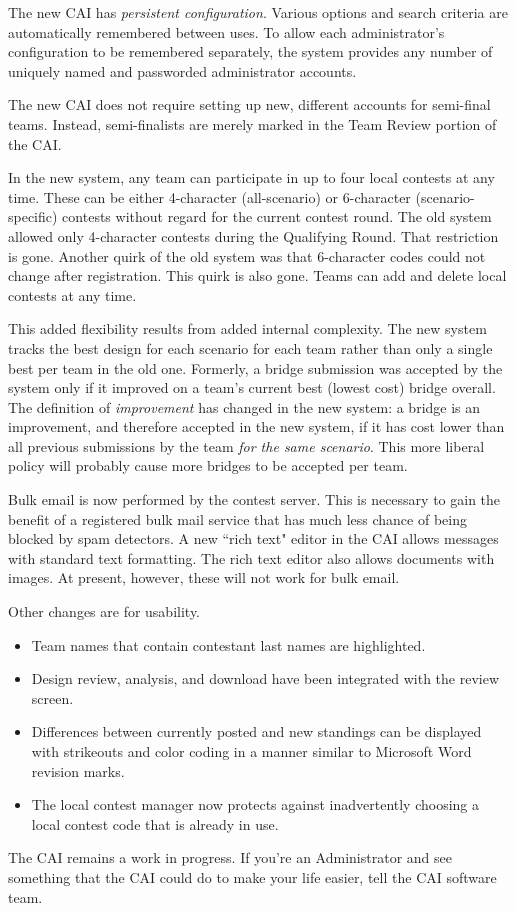 \documentclass[11pt,letterpaper]{refart}
\begin{document}
The new CAI has \emph{persistent configuration}. Various options and
search criteria are automatically remembered between uses.  To allow each 
administrator's configuration
to be remembered separately, the system provides any number of uniquely named and
passworded administrator accounts.

The new CAI does not require setting up new, different accounts for semi-final teams. 
Instead, semi-finalists are merely marked in the Team Review portion of the CAI.  

In the new system, any team can participate in up to four local contests at any time.
These can be either 
4-character (all-scenario) or 6-character (scenario-specific) contests without regard for the 
current contest round. The old system allowed only 4-character contests 
during the Qualifying Round. That restriction is gone.  Another quirk of the 
old system was that 6-character codes could not change after registration.  This quirk is 
also gone. Teams can add and delete local contests at any time. 

This added flexibility results from added internal complexity. The new system tracks the  
best  design for each scenario for each team rather than only a single best per team in 
the old one.  Formerly, a bridge submission was accepted by the system only if 
it improved on a team's current best (lowest cost) bridge overall.  The definition of 
\emph{improvement} has changed in the new system: a bridge is an improvement, and 
therefore accepted in the new system, if it has cost
lower than all previous submissions by the team \emph{for the same scenario}.  This
more liberal policy will probably cause more bridges to be accepted per team. 

Bulk email is now performed by the contest server. This is necessary to gain the benefit of
a registered bulk mail service that has much less chance of being blocked by spam detectors.
A new ``rich text" editor in the CAI allows messages with standard text formatting.
The rich text editor also allows documents with images.  At present, however, these will
not work for bulk email.

Other changes are for usability. 
\begin{itemize}
\item Team names that contain contestant last names are highlighted.
\item Design review, analysis, and download have been integrated with the review screen. 
\item Differences between currently posted and new standings can be displayed with 
  strikeouts and color coding in a manner similar to Microsoft Word revision marks. 
\item The local contest manager now protects against inadvertently choosing a local 
  contest code that is already in use.
\end{itemize}
The CAI remains a work in progress. If you're an Administrator and see something
that the CAI could do to make your life easier, tell the CAI software team.
\end{document}
